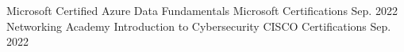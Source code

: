
\begin{cvhonors}

  \cvhonor
    {Microsoft Certified} %
    {Azure Data Fundamentals} %
    {Microsoft Certifications} %
    {Sep. 2022} %
  \cvhonor
    {Networking Academy} %
    {Introduction to Cybersecurity} %
    {CISCO Certifications} %
    {Sep. 2022} %
\end{cvhonors}
